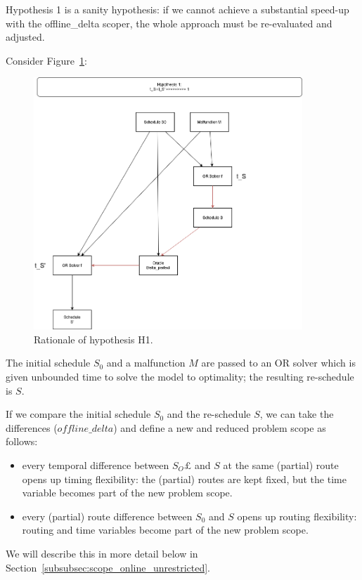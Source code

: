 \documentclass{article}
\begin{document}
Hypothesis 1 is a sanity hypothesis: if we cannot achieve a substantial speed-up with the offline\_delta scoper, the whole approach must be re-evaluated and adjusted.

Consider Figure~\ref{fig:introduction_H1}:
%
\begin{figure}[hbtp]
	\centering
  \includegraphics[width=0.9\textwidth]{introduction_H1.png}
	\caption{Rationale of hypothesis H1.}
	\label{fig:introduction_H1}
\end{figure}
%
The initial schedule $S_0$ and a malfunction $M$ are passed to an OR solver which is given unbounded time to solve the model to optimality; the resulting re-schedule is $S$.

If we compare the initial schedule $S_0$ and the re-schedule $S$, we can take the differences ($offline\_delta$) and define a new and reduced problem scope as follows:

\begin{itemize}
    \item every temporal difference between $S_O£$ and $S$ at the same (partial) route opens up timing flexibility: the (partial) routes are kept fixed, but the time variable becomes part of the new problem scope.
    \item every (partial) route  difference between $S_0$ and $S$ opens up routing flexibility: routing and time variables become part of the new problem scope.
\end{itemize}
We will describe this in more detail below in Section~\ref{subsubsec:scope_online_unrestricted}.
\end{document}
